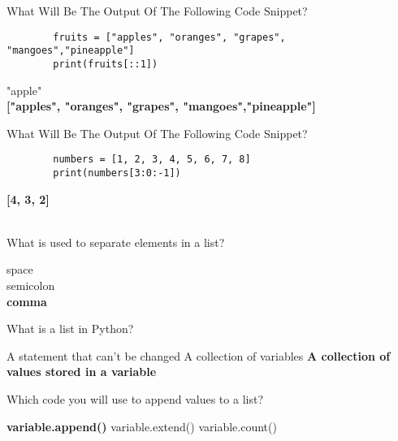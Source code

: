 \documentclass{exam}
\begin{document}
\begin{questions}
    \question What Will Be The Output Of The Following Code Snippet?
    
    \begin{verbatim}
        fruits = ["apples", "oranges", "grapes", "mangoes","pineapple"]
        print(fruits[::1])
    \end{verbatim}

    \begin{oneparchoices}
        \choice "apple" \\
        \choice \textbf{["apples", "oranges", "grapes", "mangoes","pineapple"]} \\
    \end{oneparchoices}

    \question What Will Be The Output Of The Following Code Snippet?

    \begin{verbatim}
        numbers = [1, 2, 3, 4, 5, 6, 7, 8]
        print(numbers[3:0:-1])
    \end{verbatim}

    \begin{oneparchoices}
        \choice \textbf{[4, 3, 2]} \\
        \choice [1, 2, 3, 4, 5, 6, 7, 8] \\
        \choice [4 5 6]
    \end{oneparchoices}

    \question What is used to separate elements in a list?

    \begin{oneparchoices}
        \choice space \\
        \choice semicolon \\
        \choice \textbf{comma}
    \end{oneparchoices}

    \question What is a list in Python?

    \begin{oneparchoices}
        \choice A statement that can't be changed
        \choice A collection of variables
        \choice \textbf{A collection of values stored in a variable}
    \end{oneparchoices}

    \question Which code you will use to append values to a list?

    \begin{oneparchoices}
        \choice \textbf{variable.append()}
        \choice variable.extend()
        \choice variable.count()
    \end{oneparchoices}


\end{questions}
\end{document}
